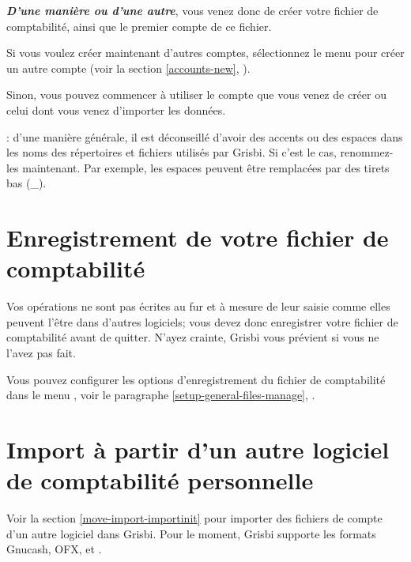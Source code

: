 \label{start-newfile-end}

\textit{\textbf{D'une manière ou d'une autre}}, vous venez donc de créer votre fichier de comptabilité, ainsi que le premier compte de ce fichier. 

Si vous voulez créer maintenant d'autres comptes, sélectionnez le menu  pour créer un autre compte (voir la section \vref{accounts-new}, ).

Sinon, vous pouvez commencer à utiliser le compte que vous venez de créer ou celui dont vous venez d'importer les données.

\textcolor{red}{} : d'une manière générale, il est déconseillé d'avoir des accents ou des espaces dans les noms des répertoires et fichiers utilisés par Grisbi. Si c'est le cas, renommez-les maintenant. Par exemple, les espaces peuvent être remplacées par des tirets bas (\_).



\section{Enregistrement de votre fichier de comptabilité\label{start-save}}


Vos opérations ne sont pas écrites au fur et à mesure de leur saisie comme 
elles peuvent l'être dans d'autres logiciels; vous devez donc enregistrer votre fichier de comptabilité avant de quitter. N'ayez crainte, Grisbi vous prévient si vous ne l'avez pas fait. 

Vous pouvez configurer les options d'enregistrement du fichier de comptabilité dans le menu , voir le paragraphe \vref{setup-general-files-manage}, .


\section{Import à partir d'un autre logiciel de comptabilité personnelle}

Voir la section \vref{move-import-importinit} pour importer des fichiers de compte d'un autre logiciel dans Grisbi.  Pour le moment, Grisbi supporte les formats \gls{Gnucash}, \gls{OFX},  et .


